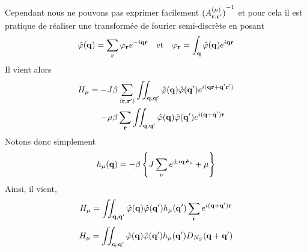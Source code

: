 \documentclass[10pt]{article}
\begin{document}
\begin{multicols}{2}
Cependant nous ne pouvons pas exprimer facilement ${(A_{{\bf r}, {\bf r}'}^{(\mu)})}^{-1}$ et pour cela il est pratique de réaliser une transformée de fourier semi-discrète en posant
\begin{equation}
  \hat{\varphi}({\bf q}) = \sum_{\bf r} \varphi_{\bf r} e^{-i{\bf q}{\bf r}} \quad \text{et} \quad \varphi_{\bf r} = \int_{\bf q} \hat{\varphi}({\bf q})  e^{i{\bf q}{\bf r}}
\end{equation}
Il vient alors
\begin{equation}
\begin{split}
  H_\mu = -J\beta & \sum_{\left<{\bf r}, {\bf r}'\right>} \iint_{{\bf q},{\bf q}'} \hat{\varphi}({\bf q}) \hat{\varphi}({\bf q}')  e^{i({\bf q}{\bf r}+{\bf q}'{\bf r}')} \\
   -\mu\beta & \sum_{\bf r} \iint_{{\bf q},{\bf q}'} \hat{\varphi}({\bf q}) \hat{\varphi}({\bf q}')  e^{i({\bf q}+{\bf q}'){\bf r}}
\end{split}
\end{equation}
Notons donc simplement
\begin{equation}
  h_\mu({\bf q}) = -\beta \left\{ J\sum_{\nu} e^{ \pm i {\bf q} \, \hat{\mathbf{e}}_\nu} +\mu \right\} 
\end{equation}
Ainsi, il vient, 
\begin{equation}
  H_\mu =   \iint_{{\bf q},{\bf q}'} \hat{\varphi}({\bf q}) \hat{\varphi}({\bf q}')   h_\mu({\bf q}')   \sum_{{\bf r}}  e^{i({\bf q}+{\bf q}'){\bf r}} \\
\end{equation}
\begin{equation}
  H_\mu =   \iint_{\qv,\qv'} \hat{\varphi}(\qv) \hat{\varphi}(\qv')   h_\mu(\qv')   D_{N_S}(\qv+\qv') \\

\end{equation}
\end{multicols}
\end{document}

